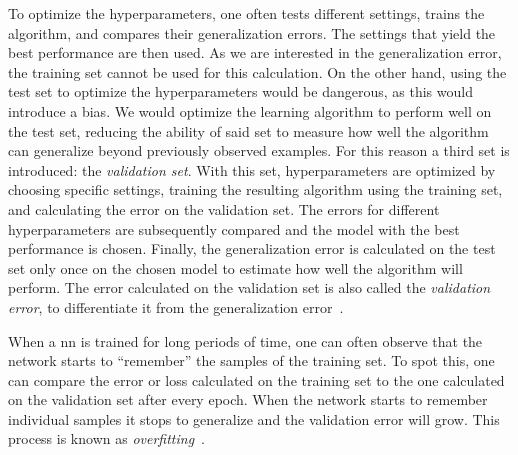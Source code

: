 To optimize the hyperparameters, one often tests different settings, trains the algorithm, and compares their generalization errors. The settings that yield the best performance are then used. As we are interested in the generalization error, the training set cannot be used for this calculation. On the other hand, using the test set to optimize the hyperparameters would be dangerous, as this would introduce a bias. We would optimize the learning algorithm to perform well on the test set, reducing the ability of said set to measure how well the algorithm can generalize beyond previously observed examples. For this reason a third set is introduced: the \emph{validation set}. With this set, hyperparameters are optimized by choosing specific settings, training the resulting algorithm using the training set, and calculating the error on the validation set. The errors for different hyperparameters are subsequently compared and the model with the best performance is chosen. Finally, the generalization error is calculated on the test set only once on the chosen model to estimate how well the algorithm will perform. The error calculated on the validation set is also called the \emph{validation error}, to differentiate it from the generalization error~\cite{Goodfellow:2016:DNN}.%

When a \acrshort{nn} is trained for long periods of time, one can often observe that the network starts to ``remember'' the samples of the training set. To spot this, one can compare the error or loss calculated on the training set to the one calculated on the validation set after every epoch. When the network starts to remember individual samples it stops to generalize and the validation error will grow. This process is known as \emph{overfitting}~\cite{Geron:2017aaa}.%

